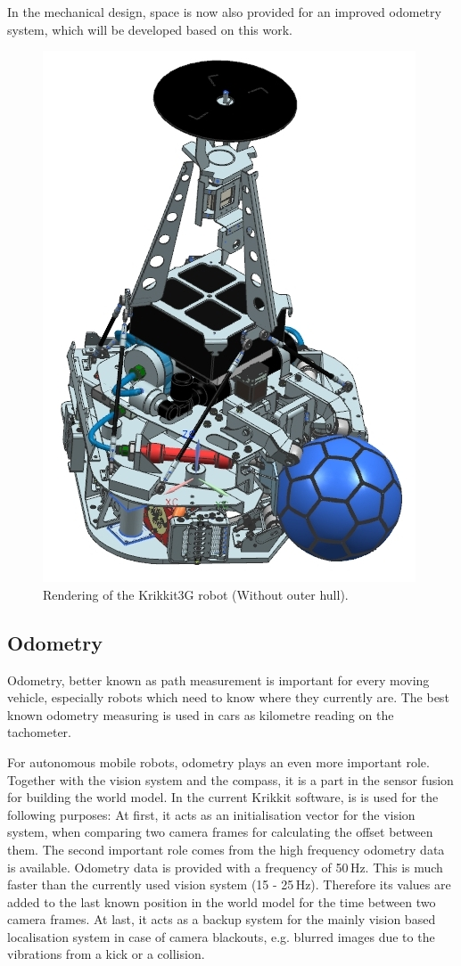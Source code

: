 \documentclass[12pt,a4paper]{article}
\begin{document}
In the mechanical design, space is now also provided for an improved odometry system, which will be developed based on this work.


\begin{figure}[b]
\begin{center}  
\includegraphics[width=0.5\columnwidth]{figures/Krikkit3G.jpg}
\caption{\label{fig:krikkit3g}
Rendering of the Krikkit3G robot (Without outer hull).
}   
\end{center}
\end{figure}



\subsection{Odometry}


Odometry, better known as path measurement is important for every moving vehicle, especially robots which need to know where they currently are. 
The best known odometry measuring is used in cars as kilometre reading on the tachometer.

For autonomous mobile robots, odometry plays an even more important role.
Together with the vision system and the compass, it is a part in the sensor fusion for building the world model.
In the current Krikkit software, is is used for the following purposes:
At first, it acts as an initialisation vector for the vision system, when comparing two camera frames for calculating the offset between them.
The second important role comes from the high frequency odometry data is available.
Odometry data is provided with a frequency of 50\,Hz. 
This is much faster than the currently used vision system (15 - 25\,Hz). 
Therefore its values are added to the last known position in the world model for the time between two camera frames.
At last, it acts as a backup system for the mainly vision based localisation system in case of camera blackouts, e.g. blurred images due to the vibrations from a kick or a collision.
\end{document}
